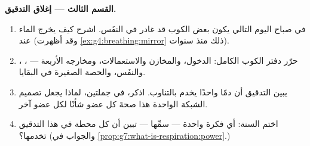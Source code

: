 \begin{problem}
\medskip\noindent\textbf{القسم الثالث --- إغلاق التدقيق.}
\begin{enumerate}[resume]
  \item في صباح اليوم التالي يكون بعض الكوب قد غادر في النفَس.
        اشرح كيف يخرج الماء عند 
        (وقد أظهرت \cref{ex:g4:breathing:mirror} ذلك منذ
        سنوات).
  \item حرّر دفتر الكوب الكامل: الدخول، والمخازن والاستعمالات،
        ومخارجه الأربعة --- ، ، والنفَس، والحصة
        الصغيرة في البقايا.
  \item يبين التدقيق أن دمًا واحدًا يخدم  
           بالتناوب. اذكر، في جملتين،
        لماذا يجعل تصميم الشبكة الواحدة هذا صحةَ كل عضو شأنًا
        لكل عضو آخر.
  \item اختم السنة: أي فكرة واحدة --- سمِّها --- تبين أن كل محطة
        في هذا التدقيق تخدمها؟ (والجواب في
        \cref{prop:g7:what-is-respiration:power}.)
\end{enumerate}
\end{problem}
